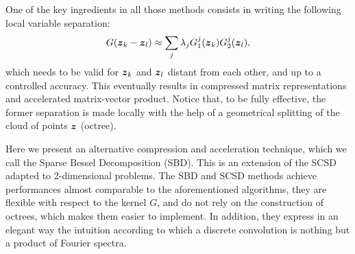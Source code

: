 \documentclass[11pt,a4paper]{article}
\begin{document}
One of the key ingredients in all those methods consists in writing the following local variable separation:
\[G(\boldsymbol{z}_k- \boldsymbol{z}_l) \approx \sum_j \lambda_j G^j_1(\boldsymbol{z}_k)G^j_2(\boldsymbol{z}_l),\] 
which needs to be valid for $\boldsymbol{z}_k$ and $\boldsymbol{z}_l$ distant from each other, and up to a controlled accuracy. This eventually results in compressed matrix representations and accelerated matrix-vector product. Notice that, to be fully effective, the former separation is made locally with the help of a geometrical splitting of the cloud of points $\boldsymbol{z}$ (octree).

Here we present an alternative compression and acceleration technique, which we call the Sparse Bessel Decomposition (SBD). This is an extension of the SCSD adapted to 2-dimensional problems. The SBD and SCSD methods achieve performances almost comparable to the aforementioned algorithms, they are flexible with respect to the kernel $G$, and do not rely on the construction of octrees, which makes them easier to implement. In addition, they express in an elegant way the intuition according to which a discrete convolution is nothing but a product of Fourier spectra. 
\end{document}

